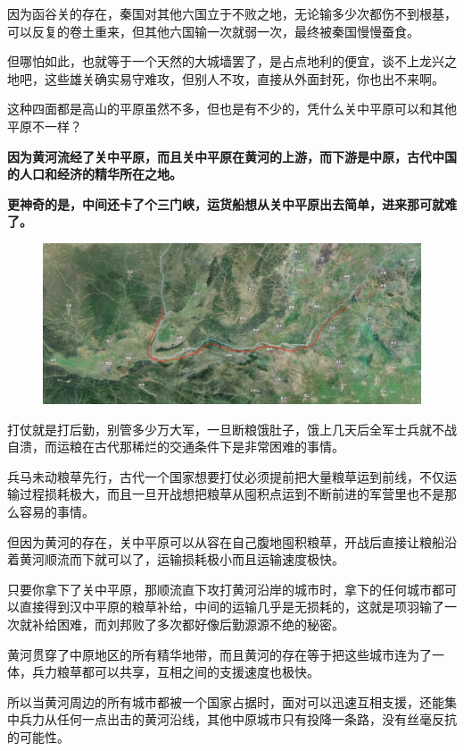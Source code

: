 \documentclass[UTF8, 11pt, oneside]{ctexart}
\newcommand{\zd}[1]{\textbf{\textcolor[RGB]{123,12,0}{#1}}} %
\begin{document}
因为函谷关的存在，秦国对其他六国立于不败之地，无论输多少次都伤不到根基，可以反复的卷土重来，但其他六国输一次就弱一次，最终被秦国慢慢蚕食。

但哪怕如此，也就等于一个天然的大城墙罢了，是占点地利的便宜，谈不上龙兴之地吧，这些雄关确实易守难攻，但别人不攻，直接从外面封死，你也出不来啊。

这种四面都是高山的平原虽然不多，但也是有不少的，凭什么关中平原可以和其他平原不一样？

\zd{因为黄河流经了关中平原，而且关中平原在黄河的上游，而下游是中原，古代中国的人口和经济的精华所在之地。}

\zd{更神奇的是，中间还卡了个三门峡，运货船想从关中平原出去简单，进来那可就难了。}

\begin{figure}[H]
    \centering
    \includegraphics[width=13cm]{2024-08-19-003.jpg}
\end{figure}

打仗就是打后勤，别管多少万大军，一旦断粮饿肚子，饿上几天后全军士兵就不战自溃，而运粮在古代那稀烂的交通条件下是非常困难的事情。

兵马未动粮草先行，古代一个国家想要打仗必须提前把大量粮草运到前线，不仅运输过程损耗极大，而且一旦开战想把粮草从囤积点运到不断前进的军营里也不是那么容易的事情。

但因为黄河的存在，关中平原可以从容在自己腹地囤积粮草，开战后直接让粮船沿着黄河顺流而下就可以了，运输损耗极小而且运输速度极快。

只要你拿下了关中平原，那顺流直下攻打黄河沿岸的城市时，拿下的任何城市都可以直接得到汉中平原的粮草补给，中间的运输几乎是无损耗的，这就是项羽输了一次就补给困难，而刘邦败了多次都好像后勤源源不绝的秘密。

黄河贯穿了中原地区的所有精华地带，而且黄河的存在等于把这些城市连为了一体，兵力粮草都可以共享，互相之间的支援速度也极快。

所以当黄河周边的所有城市都被一个国家占据时，面对可以迅速互相支援，还能集中兵力从任何一点出击的黄河沿线，其他中原城市只有投降一条路，没有丝毫反抗的可能性。
\end{document}
